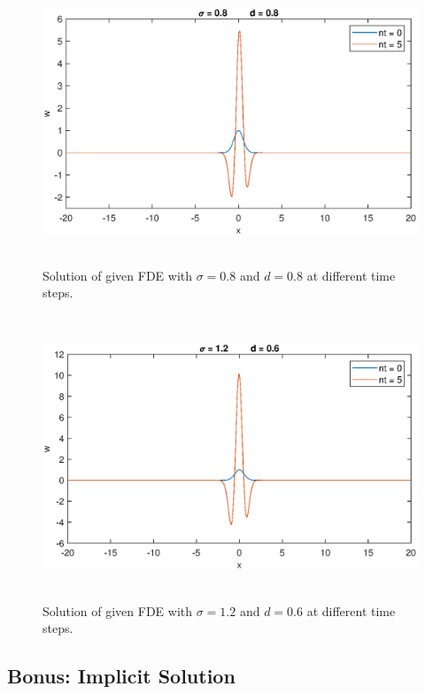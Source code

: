 \documentclass[letterpaper,12pt]{article}
\begin{document}
\newpage

\begin{figure}[!ht] 
	\centering 
	\includegraphics[max height=8.5cm]{graphs/Question4/sigma08d08.eps}
	\caption{Solution of given FDE with $\sigma= 0.8$ and $d=0.8$ at different time steps.}
	\label{fig:Q4_2}
\end{figure}

\begin{figure}[!ht] 
	\centering 
	\includegraphics[max height=8.5cm]{graphs/Question4/sigma12d06.eps}
	\caption{Solution of given FDE with $\sigma= 1.2$ and $d=0.6$ at different time steps.}
	\label{fig:Q4_3}
\end{figure}

\newpage

\subsection{Bonus: Implicit Solution}
\end{document}

